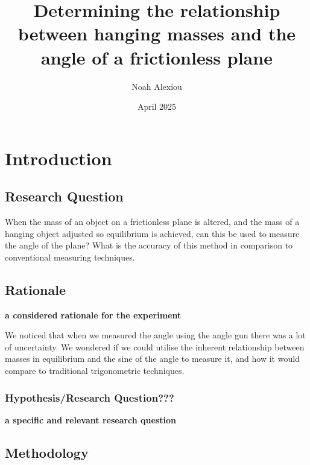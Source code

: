 \documentclass[12pt,a4paper]{article}
\begin{document}
\begin{titlepage}


\title{Determining the relationship between hanging masses and the angle of a frictionless plane}

\author{Noah Alexiou}


\date{April 2025}

\maketitle
\centering

\end{titlepage}
\tableofcontents
\newpage

\section{Introduction}

\subsection{Research Question}
When the mass of an object on a frictionless plane is altered, and the mass of a hanging object adjusted so  equilibrium is achieved, can this be used to measure the angle of the plane? What is the accuracy of this method in comparison to conventional measuring techniques. 

\subsection{Rationale}

\textbf{a considered rationale for the experiment}

We noticed that when we measured the angle using the angle gun there was a lot of uncertainty. We wondered if we could utilise the inherent relationship between masses in equilibrium and the sine of the angle to measure it, and how it would compare to traditional trigonometric techniques.



\subsubsection{Hypothesis/Research Question???}
\textbf{a specific and relevant research question}

\subsection{Methodology}
\end{document}
